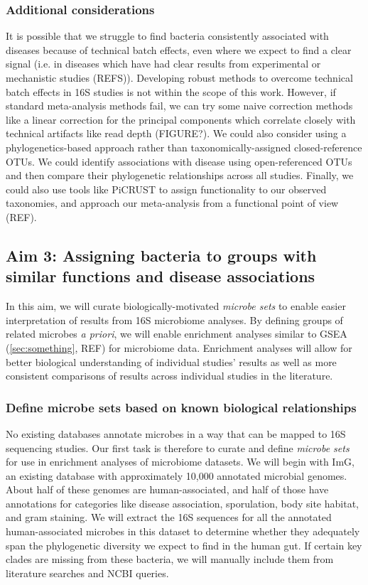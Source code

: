 \documentclass[12pt]{article}
\begin{document}
\subsubsection{Additional considerations}
It is possible that we struggle to find bacteria consistently 
associated with diseases because of technical batch effects, even 
where we expect to find a clear signal (i.e. in diseases which have 
had clear results from experimental or mechanistic studies (REFS)). 
Developing robust methods to overcome technical batch effects in 16S 
studies is not within the scope of this work. However, if standard 
meta-analysis methods fail, we can try some naive correction methods 
like a linear correction for the principal components which correlate 
closely with technical artifacts like read depth (FIGURE?). We could 
also consider using a phylogenetics-based approach rather than 
taxonomically-assigned closed-reference OTUs. We could identify 
associations with disease using open-referenced OTUs and then compare 
their phylogenetic relationships across all studies. Finally, we could 
also use tools like PiCRUST to assign functionality to our observed 
taxonomies, and approach our meta-analysis from a functional point of 
view (REF). 

\subsection{Aim 3: Assigning bacteria to groups with similar functions and disease associations}

In this aim, we will curate biologically-motivated \textit{microbe 
sets} to enable easier interpretation of results from 16S microbiome 
analyses. By defining groups of related microbes \textit{a priori}, we 
will enable enrichment analyses similar to GSEA (\ref{sec:something}, 
REF) for microbiome data. Enrichment analyses will allow for better 
biological understanding of individual studies' results as well as 
more consistent comparisons of results across individual studies in 
the literature.

\subsubsection{Define microbe sets based on known biological relationships}


No existing databases annotate microbes in a way that can be mapped to 
16S sequencing studies. Our first task is therefore to curate and 
define \textit{microbe sets} for use in enrichment analyses of 
microbiome datasets. We will begin with ImG, an existing database with 
approximately 10,000 annotated microbial genomes. About half of these 
genomes are human-associated, and half of those have annotations for 
categories like disease association, sporulation, body site habitat, 
and gram staining. We will extract the 16S sequences for all the 
annotated human-associated microbes in this dataset to determine 
whether they adequately span the phylogenetic diversity we expect to 
find in the human gut. If certain key clades are missing from these 
bacteria, we will manually include them from literature searches and 
NCBI queries.
\end{document}
